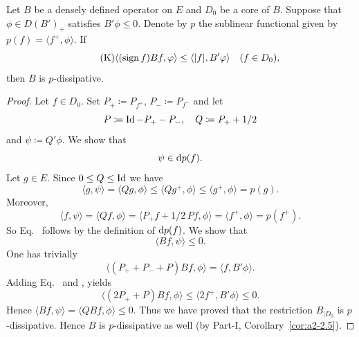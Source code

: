 \begin{proposition}\label{prop:c2-3.10}
Let $B$ be a densely defined operator on $E$ and $D_{0}$ be a core of\/ $B$.
Suppose that $\phi \in D(B')_{+}$ satisfies $B'\phi \leq 0$.
Denote by $p$ the sublinear functional given by $p(f) = \langle f^{+},\phi \rangle$. 
If
\begin{equation*}\label{eq:c2-K6} \tag{K}
	\langle(\sign f) Bf,\phi \rangle \leq \langle|f|,B'\phi\rangle \quad (f \in D_{0}),
\end{equation*}
then $B$ is $p$-dissipative.
\end{proposition}
\begin{proof}
Let $f \in D_{0}$. 
Set $P_{+} \coloneq P_{f^{+}}$, $P_{-} \coloneq P_{f^{-}}$ and let
\[
P \coloneq \operatorname{Id} - P_{+} - P_{-} , \quad Q \coloneq P_{+} + 1/2
\]
and $\psi \coloneq Q'\phi$. We show that
\begin{equation}\label{eq:c2-3.2}
\psi \in \mathop{}\!\mathrm{d}{p}(f).
\end{equation}
Let $g \in E$. 
Since $0 \leq Q \leq \Id$ we have 
\[
\langle g,\psi \rangle = \langle Qg,\phi \rangle \leq \langle Qg^{+},\phi \rangle \leq
\langle g^{+},\phi \rangle = p(g) .
\]
Moreover, 
\[\langle f, \psi \rangle = \langle Qf,\phi \rangle = \langle P_{+}f + 1/2 \, Pf,\phi \rangle = \langle f^{+},\phi \rangle = p(f^{+}) .
\]
So Eq.~ follows by the definition of\/ $\mathop{}\!\mathrm{d}{p}(f)$. 
We show that
\begin{equation}\label{eq:c2-3.3}
\langle Bf,\psi \rangle \leq 0.
\end{equation}
One has trivially
\begin{equation}\label{eq:c2-3.4}
\langle(P_{+} + P_{-} + P) Bf,\phi \rangle = \langle f,B'\phi \rangle.
\end{equation}
Adding Eq.~ and ,  yields
\[
\langle(2P_{+} + P)Bf,\phi \rangle \leq \langle 2f^{+},B'\phi \rangle \leq 0 .
\]
Hence $\langle Bf,\psi \rangle = \langle QBf,\phi \rangle \leq 0$.
Thus we have proved that the restriction  $B_{|D_{0}}$ is $p$-dissipative. 
Hence $B$ is $p$-dissipative as well (by Part-I, Corollary~\ref{cor:a2-2.5}).
\end{proof}

